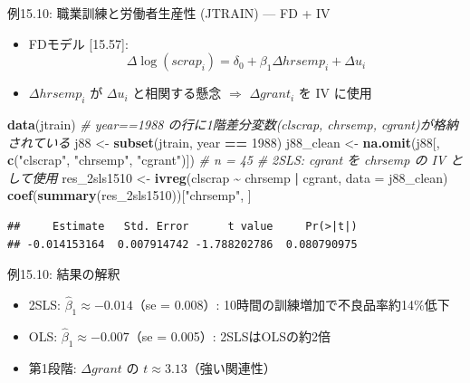 \documentclass[
  ignorenonframetext,
]{beamer}
\newenvironment{Shaded}{\begin{snugshade}}{\end{snugshade}}
\newcommand{\AttributeTok}[1]{\textcolor[rgb]{0.13,0.29,0.53}{#1}}
\newcommand{\CommentTok}[1]{\textcolor[rgb]{0.56,0.35,0.01}{\textit{#1}}}
\newcommand{\DecValTok}[1]{\textcolor[rgb]{0.00,0.00,0.81}{#1}}
\newcommand{\FunctionTok}[1]{\textcolor[rgb]{0.13,0.29,0.53}{\textbf{#1}}}
\newcommand{\NormalTok}[1]{#1}
\newcommand{\OtherTok}[1]{\textcolor[rgb]{0.56,0.35,0.01}{#1}}
\newcommand{\SpecialCharTok}[1]{\textcolor[rgb]{0.81,0.36,0.00}{\textbf{#1}}}
\newcommand{\StringTok}[1]{\textcolor[rgb]{0.31,0.60,0.02}{#1}}
\providecommand{\tightlist}{%
  \setlength{\itemsep}{0pt}\setlength{\parskip}{0pt}}
\begin{document}
\begin{frame}[fragile]{例15.10: 職業訓練と労働者生産性 (JTRAIN) --- FD +
IV}
\label{ux4f8b15.10-ux8077ux696dux8a13ux7df4ux3068ux52b4ux50cdux8005ux751fux7523ux6027-jtrain-fd-iv}
\begin{itemize}
\tightlist
\item
  FDモデル {[}15.57{]}:
  \[\Delta\log(scrap_i) = \delta_0 + \beta_1 \Delta hrsemp_i + \Delta u_i\]
\item
  \(\Delta hrsemp_i\) が \(\Delta u_i\) と相関する懸念 \(\Rightarrow\)
  \(\Delta grant_i\) を IV に使用
\end{itemize}

\scriptsize

\begin{Shaded}
\begin{Highlighting}[]
\FunctionTok{data}\NormalTok{(jtrain)}
\CommentTok{\# year==1988 の行に1階差分変数(clscrap, chrsemp, cgrant)が格納されている}
\NormalTok{j88 }\OtherTok{\textless{}{-}} \FunctionTok{subset}\NormalTok{(jtrain, year }\SpecialCharTok{==} \DecValTok{1988}\NormalTok{)}
\NormalTok{j88\_clean }\OtherTok{\textless{}{-}} \FunctionTok{na.omit}\NormalTok{(j88[, }\FunctionTok{c}\NormalTok{(}\StringTok{"clscrap"}\NormalTok{, }\StringTok{"chrsemp"}\NormalTok{, }\StringTok{"cgrant"}\NormalTok{)])  }\CommentTok{\# n = 45}
\CommentTok{\# 2SLS: cgrant を chrsemp の IV として使用}
\NormalTok{res\_2sls1510 }\OtherTok{\textless{}{-}} \FunctionTok{ivreg}\NormalTok{(clscrap }\SpecialCharTok{\textasciitilde{}}\NormalTok{ chrsemp }\SpecialCharTok{|}\NormalTok{ cgrant, }\AttributeTok{data =}\NormalTok{ j88\_clean)}
\FunctionTok{coef}\NormalTok{(}\FunctionTok{summary}\NormalTok{(res\_2sls1510))[}\StringTok{"chrsemp"}\NormalTok{, ]}
\end{Highlighting}
\end{Shaded}

\begin{verbatim}
##     Estimate   Std. Error      t value     Pr(>|t|) 
## -0.014153164  0.007914742 -1.788202786  0.080790975
\end{verbatim}

\normalsize
\end{frame}

\begin{frame}{例15.10: 結果の解釈}
\label{ux4f8b15.10-ux7d50ux679cux306eux89e3ux91c8}
\begin{itemize}
\tightlist
\item
  2SLS: \(\hat{\beta}_1 \approx -0.014\)（se = 0.008）:
  10時間の訓練増加で不良品率約14\%低下
\item
  OLS: \(\hat{\beta}_1 \approx -0.007\)（se = 0.005）: 2SLSはOLSの約2倍
\item
  第1段階: \(\Delta grant\) の \(t \approx 3.13\)（強い関連性）
\end{itemize}
\end{frame}
\end{document}
